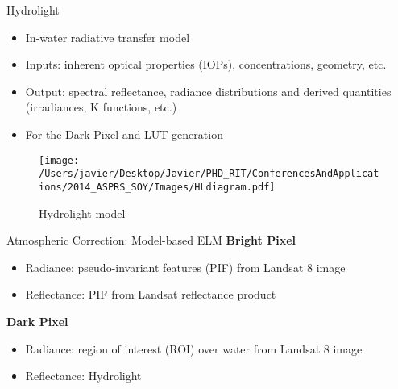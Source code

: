 \documentclass[mathserif]{beamer}
\begin{document}
\begin{frame}{}
\begin{columns}[t]
\begin{column}{.3\linewidth}
\begin{block}{Hydrolight}
\small
\begin{itemize}
  \item In-water radiative transfer model
  \vspace{0.5cm}
  \item Inputs: inherent optical properties (IOPs), concentrations, geometry, etc.
  \vspace{0.5cm}
  \item Output: spectral reflectance, radiance distributions and derived quantities (irradiances, K functions, etc.)
  \vspace{0.5cm}
  \item For the Dark Pixel and LUT generation
\end{itemize}
\vspace{1cm}
\begin{figure}[H]
    \texttt{[image: /Users/javier/Desktop/Javier/PHD\_RIT/ConferencesAndApplications/2014\_ASPRS\_SOY/Images/HLdiagram.pdf]}
    \caption{Hydrolight model}
\end{figure}
\end{block}


\begin{block}{Atmospheric Correction: Model-based ELM}
{\large \bf Bright Pixel}
\begin{itemize}
    \item Radiance: pseudo-invariant features (PIF) from Landsat 8 image
    \vspace{0.5cm}
    \item Reflectance: PIF from Landsat reflectance product
\end{itemize}
\vspace{0.3cm}
{\large \bf Dark Pixel}

\begin{itemize}
    \item Radiance: region of interest (ROI) over water from Landsat 8 image
    \vspace{0.5cm}
    \item Reflectance: Hydrolight
\end{itemize}
\vspace{1cm}


\end{block}
\end{column}
\end{columns}
\end{frame}
\end{document}

